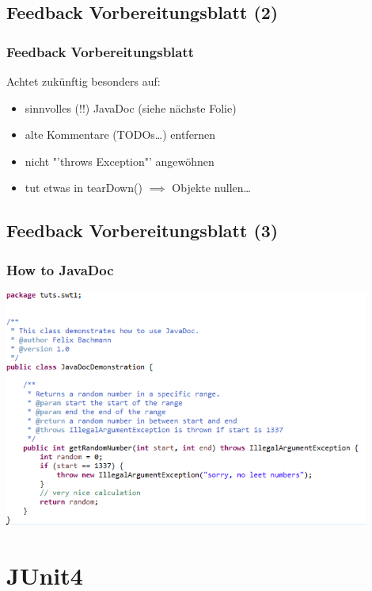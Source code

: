 \documentclass[18pt]{beamer}
\begin{document}
	\subsection{Feedback Vorbereitungsblatt (2)}
	\begin{frame}
		\frametitle{Feedback Vorbereitungsblatt}
		Achtet zukünftig besonders auf:
		\begin{itemize}
			\item sinnvolles (!!) JavaDoc (siehe nächste Folie)
			\item alte Kommentare (TODOs\dots) entfernen
			\item nicht "'throws Exception"' angewöhnen
			\item tut etwas in tearDown() $\implies$ Objekte nullen\dots
		\end{itemize}
	\end{frame}
	
	\subsection{Feedback Vorbereitungsblatt (3)}
	\begin{frame}
		\frametitle{How to JavaDoc}
		\includegraphics[width=0.9\textwidth, scale=1.0]{./pics/tut0/javadoc-demo.png}
	\end{frame}
			
\section{JUnit4}	
\end{document}
